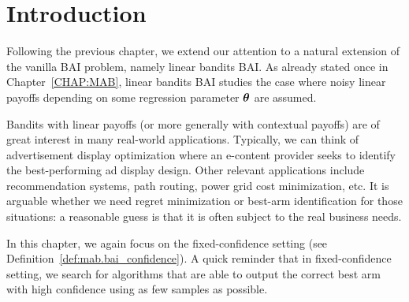 \section{Introduction}\label{sec:lgc.intro}


Following the previous chapter, we extend our attention to a natural extension of the vanilla BAI problem, namely linear bandits BAI. As already stated once in Chapter~\ref{CHAP:MAB}, linear bandits BAI studies the case where noisy linear payoffs depending on some regression parameter ${\boldsymbol \theta}$ are assumed.

Bandits with linear payoffs (or more generally with contextual payoffs) are of great interest in many real-world applications. Typically, we can think of advertisement display optimization where an e-content provider seeks to identify the best-performing ad display design. Other relevant applications include recommendation systems, path routing, power grid cost minimization, etc. It is arguable whether we need regret minimization or best-arm identification for those situations: a reasonable guess is that it is often subject to the real business needs.

In this chapter, we again focus on the fixed-confidence setting (see Definition~\ref{def:mab.bai_confidence}). A quick reminder that in fixed-confidence setting, we search for algorithms that are able to output the correct best arm with high confidence using as few samples as possible.


